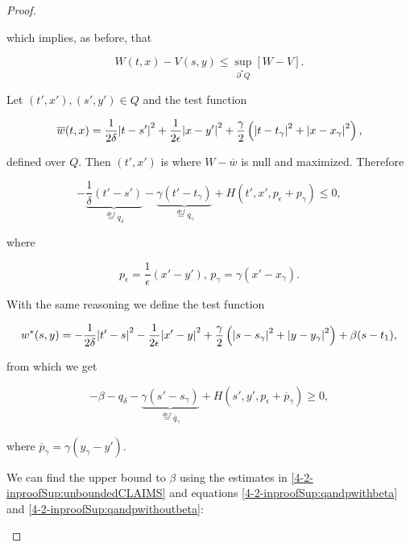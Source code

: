 \begin{proof}
\begin{enumerate}[label=\arabic*')]
        which implies, as before, that

        \[W(t,x) - V(s,y)\leq \sup_{\partial^{\ast}Q}[W-V].\]

        Let $(t',x'),(s',y')\in Q$ and the test function

        \[\overline{w}(t,x)=\frac{1}{2\delta}\abs{t-s'}^2+\frac{1}{2\epsilon}\abs{x-y'}^2+\frac{\gamma}{2}\left(\abs{t-t_{\gamma}}^2+\abs{x-x_{\gamma}}^2\right),\]

        defined over $Q$. Then $(t',x')$ is where $W-\overline{w}$ is null and maximized. Therefore

        \begin{equation}\label{4-2-inproofSup:qandpwithoutbeta}
             - \underbrace{\frac{1}{\delta}(t'-s')}_{\overset{def}{=}q_{\delta}}  - \underbrace{\gamma(t'-t_{\gamma})}_{\overset{def}{=}q_{\gamma}} + H(t',x',p_{\epsilon}+p_{\gamma}) \leq 0, 
        \end{equation}

        where

        \[p_{\epsilon}=\frac{1}{\epsilon}(x'-y'),\, p_{\gamma}=\gamma(x'-x_{\gamma}).\]

        With the same reasoning we define the test function

        \[w^{\ast}(s,y)=-\frac{1}{2\delta}\abs{t'-s}^2-\frac{1}{2\epsilon}\abs{x'-y}^2+\frac{\gamma}{2}\left(\abs{s-s_{\gamma}}^2+\abs{y-y_{\gamma}}^2\right)+\beta(s-t_1),\]

        from which we get

        \begin{equation}\label{4-2-inproofSup:qandpwithbeta}
            - \beta - q_{\delta}  - \underbrace{\gamma(s'-s_{\gamma})}_{\overset{def}{=}\overline{q}_{\gamma}} + H(s',y',p_{\epsilon}+\overline{p}_{\gamma}) \geq 0, 
       \end{equation}

       where $\overline{p}_{\gamma} = \gamma(y_{\gamma}-y').$

       We can find the upper bound to $\beta$ using the estimates in \ref{4-2-inproofSup:unboundedCLAIMS} and equations \ref{4-2-inproofSup:qandpwithbeta} and \ref{4-2-inproofSup:qandpwithoutbeta}:


\end{enumerate}
\end{proof}

